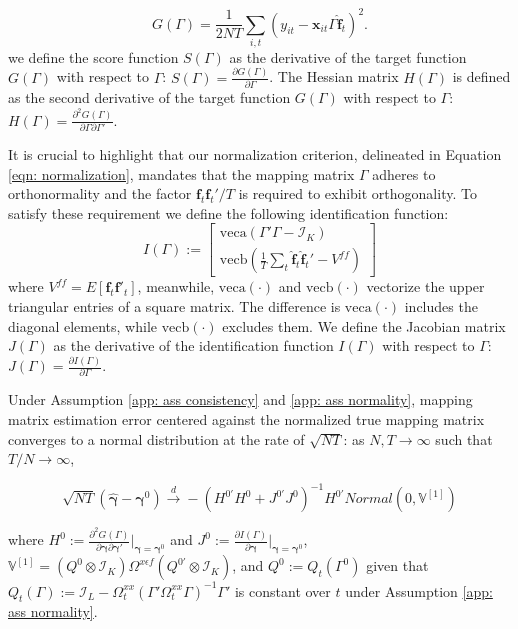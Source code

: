 \documentclass[12pt]{article}
\begin{document}
\begin{equation}
\label{eqn: target}
G(\Gamma) = \frac{1}{2NT}\sum_{i,t} \left( y_{it} - \bm{x}_{it}\Gamma \bm{\hat{f}}_t \right)^2.
\end{equation}
we define the score function $S(\Gamma)$ as the derivative of the target function $G(\Gamma)$ with respect to $\Gamma$: $S(\Gamma) = \frac{\partial G(\Gamma)}{\partial \Gamma}$. The Hessian matrix $H(\Gamma)$ is defined as the second derivative of the target function $G(\Gamma)$ with respect to $\Gamma$: $H(\Gamma) = \frac{\partial^2 G(\Gamma)}{\partial \Gamma \partial \Gamma'}$. 

It is crucial to highlight that our normalization criterion, delineated in Equation \ref{eqn: normalization}, mandates that the mapping matrix $\Gamma$ adheres to orthonormality and the factor $\bm{f}_t\bm{f}_t'/T$ is required to exhibit orthogonality. To satisfy these requirement we define the following identification function:
\begin{equation}
\label{eqn: identification}
I(\Gamma) := \begin{bmatrix}
    \text{veca}(\Gamma' \Gamma - \mathcal{I}_K) \\
    \text{vecb}\left(\frac{1}{T} \sum_{t} \bm{\hat{f}}_t\bm{\hat{f}}_t' - V^{ff}\right)
    \end{bmatrix}
\end{equation}
where $V^{ff} = E\left[\bm{f}_t\bm{f}'_t\right]$, meanwhile, $\text{veca}(\cdot)$ and $\text{vecb}(\cdot)$ vectorize the upper triangular entries of a square matrix. The difference is $\text{veca}(\cdot)$ includes the diagonal elements, while $\text{vecb}(\cdot)$ excludes them. We define the Jacobian matrix $J(\Gamma)$ as the derivative of the identification function $I(\Gamma)$ with respect to $\Gamma$: $J(\Gamma) = \frac{\partial I(\Gamma)}{\partial \Gamma}$.

\begin{proposition}
\label{prop: gamma}
Under Assumption \ref{app: ass consistency} and \ref{app: ass normality}, mapping matrix estimation error centered against the normalized true mapping matrix converges to a normal distribution at the rate of $\sqrt{NT}$: as $N, T \rightarrow \infty$ such that $T/N \rightarrow \infty$,

$$
\sqrt{NT} \left( \hat{\bm{\gamma}} - \bm{\gamma}^0 \right) \xrightarrow{d} - \left( H^{0'}H^0 + J^{0'}J^0 \right)^{-1}H^{0'}Normal(0, \mathbb{V}^{[1]})
$$
\end{proposition}
where $H^0:= \frac{\partial^2 G(\Gamma)}{\partial \bm{\gamma}\partial \bm{\gamma}'}|_{\bm{\gamma} = \bm{\gamma}^0}$ and $J^0:= \frac{\partial I(\Gamma)}{\partial \bm{\gamma}}|_{\bm{\gamma} = \bm{\gamma}^0}$, $\mathbb{V}^{[1]} = \left( Q^0 \otimes \mathcal{I}_K \right) \Omega^{x\epsilon f} \left( Q^{0'} \otimes \mathcal{I}_K \right)$, and $Q^0 := Q_t(\Gamma^0)$ given that $Q_t(\Gamma) := \mathcal{I}_L - \Omega_t^{xx} \left( \Gamma' \Omega^{xx}_t \Gamma \right)^{-1}\Gamma'$ is constant over $t$ under Assumption \ref{app: ass normality}.
\end{document}
